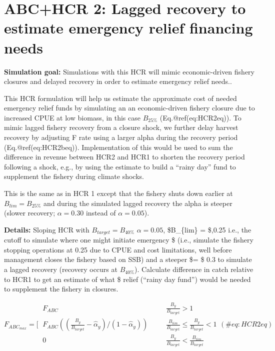 \documentclass[
]{article}
\begin{document}
\section{ABC+HCR 2: Lagged recovery to estimate emergency relief
financing
needs}\label{abchcr-2-lagged-recovery-to-estimate-emergency-relief-financing-needs}

\textbf{Simulation goal:} Simulations with this HCR will mimic
economic-driven fishery closures and delayed recovery in order to
estimate emergency relief needs..

This HCR formulation will help us estimate the approximate cost of
needed emergency relief funds by simulating an an economic-driven
fishery closure due to increased CPUE at low biomass, in this case
\(B_{25\%}\) (Eq.@ref(eq:HCR2eq)). To mimic lagged fishery recovery from
a closure shock, we further delay harvest recovery by adjusting F rate
using a larger alpha during the recovery period (Eq.@ref(eq:HCR2beq)).
Implementation of this would be used to sum the difference in revenue
between HCR2 and HCR1 to shorten the recovery period following a shock,
e.g., by using the estimate to build a ``rainy day'' fund to supplement
the fishery during climate shocks.

This is the same as in HCR 1 except that the fishery shuts down earlier
at \(B_{lim} = B_{25\%}\) and during the simulated lagged recovery the
alpha is steeper (slower recovery; \(\alpha = 0.30\) instead of
\(\alpha = 0.05\)).

\textbf{Details:} Sloping HCR with \(B_{target} = B_{40\%}\)
\(\alpha = 0.05\), \$B\_\{lim\} = \$,0.25 i.e., the cutoff to simulate
where one might initiate emergency \$ (i.e., simulate the fishery
stopping operations at 0.25 due to CPUE and cost limitations, well
before management closes the fishery based on SSB) and a steeper
\$\alpha = \$ 0.3 to simulate a lagged recovery (recovery occurs at
\(B_{40\%}\)). Calculate difference in catch relative to HCR1 to get an
estimate of what \$ relief (``rainy day fund'') would be needed to
supplement the fishery in closures.

\begin{equation}
F_{ABC_{max}} =\Biggl[~
   \begin{array}{ll}  
     F_{ABC} &~~~~~~~~ \frac{B_y}{B_{target}}>1 \\  
     F_{ABC}((\frac{B_y}{B_{target}}-\hat\alpha_y)/(1-\hat\alpha_y)) &~~~~~~~~   \frac{B_{lim}}{B_{target}} \le \frac{B_y}{B_{target}} < 1\\  
     0 &~~~~~~~~ \frac{B_y}{B_{target}}< \frac{B_{lim}}{B_{target}} 
 \end{array}(\#eq:HCR2eq)
\end{equation}
\end{document}
